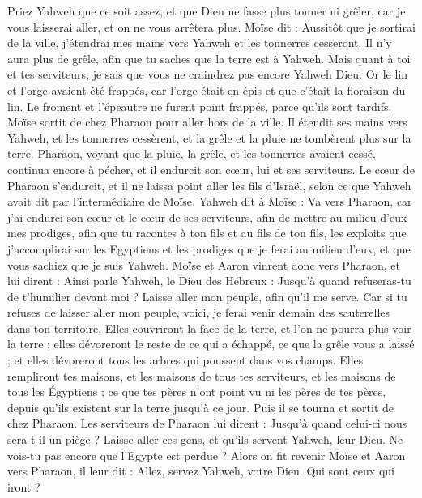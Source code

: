 \begin{multicols}{2}
Priez Yahweh que ce soit assez, et que Dieu ne fasse plus tonner ni grêler, car je vous laisserai aller, et on ne vous arrêtera plus.
Moïse dit : Aussitôt que je sortirai de la ville, j'étendrai mes mains vers Yahweh et les tonnerres cesseront. Il n'y aura plus de grêle, afin que tu saches que la terre est à Yahweh\FTNT{}.
Mais quant à toi et tes serviteurs, je sais que vous ne craindrez pas encore Yahweh Dieu.
Or le lin et l'orge avaient été frappés, car l'orge était en épis et que c’était la floraison du lin.
Le froment et l'épeautre ne furent point frappés, parce qu'ils sont tardifs.
Moïse sortit de chez Pharaon pour aller hors de la ville. Il étendit ses mains vers Yahweh, et les tonnerres cessèrent, et la grêle et la pluie ne tombèrent plus sur la terre.
Pharaon, voyant que la pluie, la grêle, et les tonnerres avaient cessé, continua encore à pécher, et il endurcit son cœur, lui et ses serviteurs.
Le cœur de Pharaon s'endurcit, et il ne laissa point aller les fils d'Israël, selon ce que Yahweh avait dit par l’intermédiaire de Moïse.
\VerseOne{}Yahweh dit à Moïse : Va vers Pharaon, car j'ai endurci son cœur et le cœur de ses serviteurs, afin de mettre au milieu d'eux mes prodiges,
afin que tu racontes à ton fils et au fils de ton fils, les exploits que j’accomplirai sur les Egyptiens et les prodiges que je ferai au milieu d'eux, et que vous sachiez que je suis Yahweh.
Moïse et Aaron vinrent donc vers Pharaon, et lui dirent : Ainsi parle Yahweh, le Dieu des Hébreux : Jusqu'à quand refuseras-tu de t'humilier devant moi ? Laisse aller mon peuple, afin qu'il me serve.
Car si tu refuses de laisser aller mon peuple, voici, je ferai venir demain des sauterelles dans ton territoire.
Elles couvriront la face de la terre, et l'on ne pourra plus voir la terre ; elles dévoreront le reste de ce qui a échappé, ce que la grêle vous a laissé ; et elles dévoreront tous les arbres qui poussent dans vos champs.
Elles rempliront tes maisons, et les maisons de tous tes serviteurs, et les maisons de tous les Égyptiens ; ce que tes pères n'ont point vu ni les pères de tes pères, depuis qu’ils existent sur la terre jusqu'à ce jour. Puis il se tourna et sortit de chez Pharaon.
Les serviteurs de Pharaon lui dirent : Jusqu'à quand celui-ci nous sera-t-il un piège ? Laisse aller ces gens, et qu'ils servent Yahweh, leur Dieu. Ne vois-tu pas encore que l'Egypte est perdue ?
Alors on fit revenir Moïse et Aaron vers Pharaon, il leur dit : Allez, servez Yahweh, votre Dieu. Qui sont ceux qui iront ?

\end{multicols}
